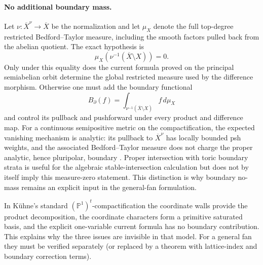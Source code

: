 \documentclass[10pt,a4paper]{amsart}
\theoremstyle{plain}
\theoremstyle{plain}
\numberwithin{equation}{section}
\begin{document}
\paragraph{No additional boundary mass.}
Let \(\nu:\overline X^\nu\to\overline X\) be the normalization and let
\(\mu_X\) denote the full top-degree restricted Bedford--Taylor measure,
including the smooth factors pulled back from the abelian quotient.  The exact
hypothesis is
\[
\mu_X\!\left(\nu^{-1}(\overline X\setminus X)\right)=0.
\]
Only under this equality does the current formula proved on the principal
semiabelian orbit determine the global restricted measure used by the
difference morphism.  Otherwise one must add the boundary functional
\[
B_\partial(f)=
\int_{\nu^{-1}(\overline X\setminus X)} f\,d\mu_X
\]
and control its pullback and pushforward under every product and difference
map.  For a continuous semipositive metric on the compactification, the
expected vanishing mechanism is analytic: its pullback to \(\overline X^\nu\)
has locally bounded psh weights, and the associated Bedford--Taylor measure
does not charge the proper analytic, hence pluripolar, boundary
\cite[Subsection~2.3]{Ku1}.  Proper
intersection with toric boundary strata is useful for the algebraic
stable-intersection calculation but does not by itself imply this measure-zero
statement.  This distinction is why boundary no-mass remains an explicit
input in the general-fan formulation.

In K\"uhne's standard \((\mathbb P^1)^t\)-compactification the coordinate
walls provide the product decomposition, the coordinate characters form a
primitive saturated basis, and the explicit one-variable current formula has
no boundary contribution.  This explains why the three issues are invisible
in that model.  For a general fan they must be verified separately (or
replaced by a theorem with lattice-index and boundary correction terms).
\end{document}
